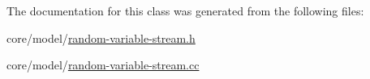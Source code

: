 The documentation for this class was generated from the following files\+:\begin{DoxyCompactItemize}
\item 
core/model/\hyperlink{random-variable-stream_8h}{random-\/variable-\/stream.\+h}\item 
core/model/\hyperlink{random-variable-stream_8cc}{random-\/variable-\/stream.\+cc}\end{DoxyCompactItemize}

